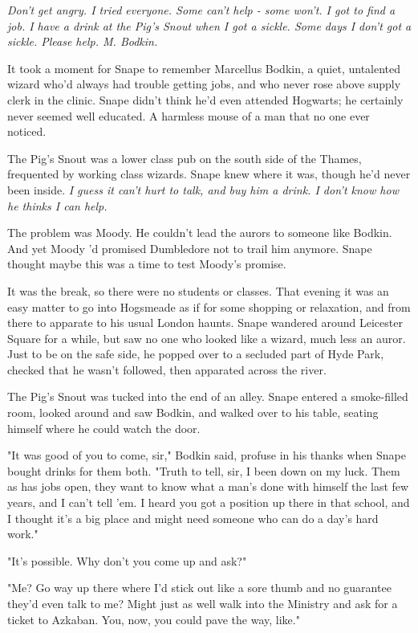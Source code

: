 \emph{Don't get angry. I tried everyone. Some can't help - some won't. I got to find a job. I have a drink at the Pig's Snout when I got a sickle. Some days I don't got a sickle. Please help. M. Bodkin.}

It took a moment for Snape to remember Marcellus Bodkin, a quiet, untalented wizard who'd always had trouble getting jobs, and who never rose above supply clerk in the clinic. Snape didn't think he'd even attended Hogwarts; he certainly never seemed well educated. A harmless mouse of a man that no one ever noticed.

The Pig's Snout was a lower class pub on the south side of the Thames, frequented by working class wizards. Snape knew where it was, though he'd never been inside. \emph{I guess it can't hurt to talk, and buy him a drink. I don't know how he thinks I can help.}

The problem was Moody. He couldn't lead the aurors to someone like Bodkin. And yet Moody 'd promised Dumbledore not to trail him anymore. Snape thought maybe this was a time to test Moody's promise.

It was the break, so there were no students or classes. That evening it was an easy matter to go into Hogsmeade as if for some shopping or relaxation, and from there to apparate to his usual London haunts. Snape wandered around Leicester Square for a while, but saw no one who looked like a wizard, much less an auror. Just to be on the safe side, he popped over to a secluded part of Hyde Park, checked that he wasn't followed, then apparated across the river.

The Pig's Snout was tucked into the end of an alley. Snape entered a smoke-filled room, looked around and saw Bodkin, and walked over to his table, seating himself where he could watch the door.

"It was good of you to come, sir," Bodkin said, profuse in his thanks when Snape bought drinks for them both. "Truth to tell, sir, I been down on my luck. Them as has jobs open, they want to know what a man's done with himself the last few years, and I can't tell 'em. I heard you got a position up there in that school, and I thought it's a big place and might need someone who can do a day's hard work."

"It's possible. Why don't you come up and ask?"

"Me? Go way up there where I'd stick out like a sore thumb and no guarantee they'd even talk to me? Might just as well walk into the Ministry and ask for a ticket to Azkaban. You, now, you could pave the way, like."

